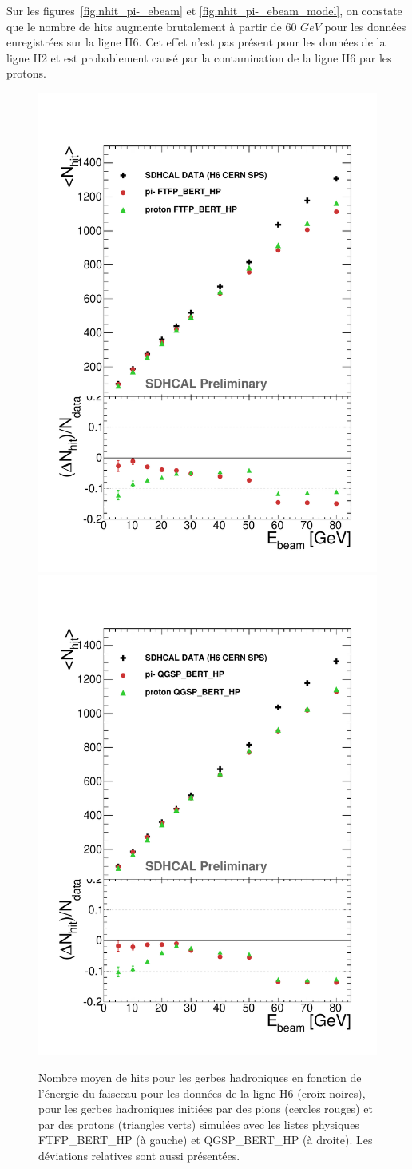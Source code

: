 Sur les figures~\ref{fig.nhit_pi-_ebeam} et \ref{fig.nhit_pi-_ebeam_model}, on constate que le nombre de hits augmente brutalement à partir de 60 $GeV$ pour les données enregistrées sur la ligne H6. Cet effet n'est pas présent pour les données de la ligne H2 et est probablement causé par la contamination de la ligne H6 par les protons. 
\begin{figure}[!ht]
  \includegraphics[width=.5\textwidth]{Digitizer/figs/NHITPROTON.pdf}
  \includegraphics[width=.5\textwidth]{Digitizer/figs/NHITPROTON_QGSP.pdf}
  \caption{Nombre moyen de hits pour les gerbes hadroniques en fonction de l'énergie du faisceau pour les données de la ligne H6 (croix noires), pour les gerbes hadroniques initiées par des pions (cercles rouges) et par des protons (triangles verts) simulées avec les listes physiques FTFP\_BERT\_HP (à gauche) et QGSP\_BERT\_HP (à droite). Les déviations relatives sont aussi présentées.}
  \label{fig.nhit_proton_ebeam}
\end{figure}
